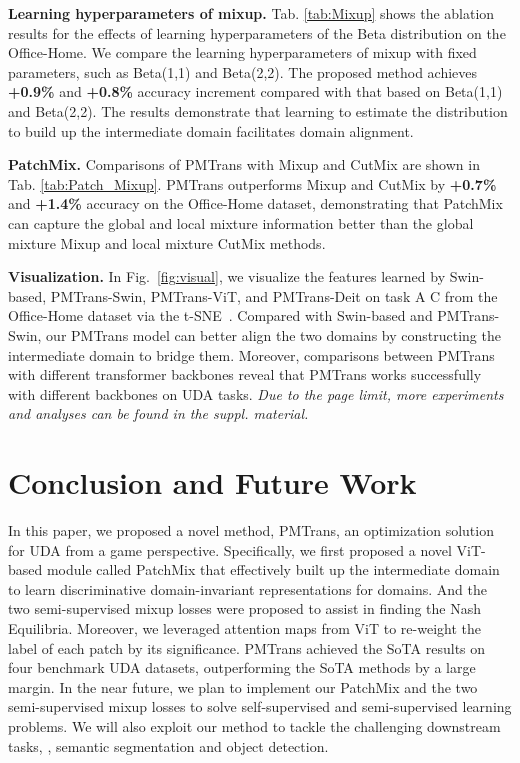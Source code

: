 \documentclass[10pt,twocolumn,letterpaper, ]{article}
\begin{document}
\noindent\textbf{Learning hyperparameters of mixup.}
Tab. \ref{tab:Mixup} shows the ablation results for the effects of learning hyperparameters of the Beta distribution on the Office-Home. We compare the learning hyperparameters of mixup with fixed parameters, such as Beta(1,1) and Beta(2,2). The proposed method achieves \textbf{+0.9\%} and \textbf{+0.8\%} accuracy increment compared with that based on Beta(1,1) and Beta(2,2). The results demonstrate that learning to estimate the distribution to build up the intermediate domain facilitates domain alignment.

\noindent\textbf{PatchMix.} Comparisons of PMTrans with Mixup \cite{ZhangCDL18} and CutMix \cite{YunHCOYC19} are shown in Tab. \ref{tab:Patch_Mixup}. PMTrans outperforms Mixup and CutMix by \textbf{+0.7\%} and \textbf{+1.4\%} accuracy on the Office-Home dataset, demonstrating that PatchMix can capture the global and local mixture information better than the global mixture Mixup and local mixture CutMix methods.

\noindent\textbf{Visualization.}
In Fig.~\ref{fig:visual}, we visualize the features learned by Swin-based, PMTrans-Swin, PMTrans-ViT, and PMTrans-Deit on task A  C from the Office-Home dataset via the t-SNE~\cite{DonahueJVHZTD14}. Compared with Swin-based and PMTrans-Swin, our PMTrans model can better align the two domains by constructing the intermediate domain to bridge them. Moreover, comparisons between PMTrans with different transformer backbones reveal that PMTrans works successfully with different backbones on UDA tasks.
\textit{Due to the page limit, more experiments and analyses can be found in the suppl. material.}
\vspace{-8pt}
\section{Conclusion and Future Work}
\vspace{-4pt}
In this paper, we proposed a novel method, PMTrans, an optimization solution for UDA from a game perspective. Specifically, we first proposed a novel ViT-based module called PatchMix that effectively built up the intermediate domain to learn discriminative domain-invariant representations for domains. And the two semi-supervised mixup losses were proposed to assist in finding the Nash Equilibria. Moreover, we leveraged attention maps from ViT to re-weight the label of each patch by its significance. PMTrans achieved the SoTA results on four benchmark UDA datasets, outperforming the SoTA methods by a large margin. In the near future, we plan to implement our PatchMix and the two semi-supervised mixup losses to solve self-supervised and semi-supervised learning problems. We will also exploit our method to tackle the challenging downstream tasks, \eg, semantic segmentation and object detection. 

\clearpage
{\small


}
\end{document}
